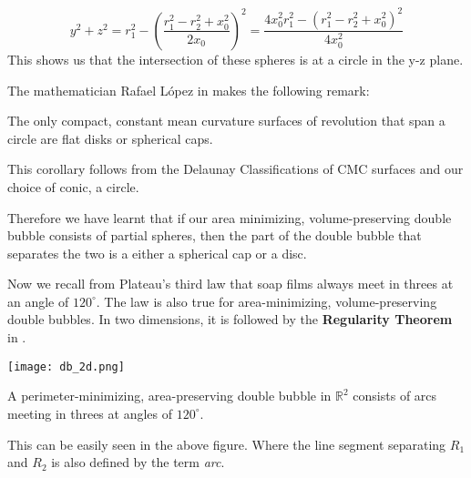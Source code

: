 \documentclass[a4paper,12pt]{report}
\begin{document}
\begin{equation}
y^{2}+z^{2}=r_{1}^{2} - (\frac{r_{1}^{2}-r_{2}^{2} + x_{0}^{2}}{2x_{0}})^{2} = \frac{4x_{0}^{2}r_{1}^{2} - (r_{1}^{2} - r_{2}^{2} + x_{0}^{2})^{2}}{4x_{0}^{2}}
\end{equation}
\vspace{1cm}
This shows us that the intersection of these spheres is at a circle in the y-z plane.\newline 
 
\hspace{-0.66cm}The mathematician Rafael L\'opez in \cite{lopez} makes the following remark:

\begin{corollary}
The only compact, constant mean curvature surfaces of revolution that span a circle are flat disks or spherical caps.
\end{corollary}

\hspace{-0.66cm}This corollary follows from the Delaunay Classifications of CMC surfaces and our choice of conic, a circle.

\hspace{-0.66cm}Therefore we have learnt that if our area minimizing, volume-preserving double bubble consists of partial spheres, then the part of the double bubble that separates the two is a either a spherical cap or a disc. 

Now we recall from Plateau's third law that soap films always meet in threes at an angle of $120^{\circ}$. The law is also true for area-minimizing, volume-preserving double bubbles. In two dimensions, it is followed by the \textbf{Regularity Theorem} in \cite{2d}.

\begin{center}
\texttt{[image: db\_2d.png]}
\end{center}

\begin{theorem}
A perimeter-minimizing, area-preserving double bubble in $\mathbb{R}^{2}$ consists of arcs meeting in threes at angles of $120^{\circ}$.
\end{theorem}

This can be easily seen in the above figure. Where the line segment separating $R_{1}$ and $R_{2}$ is also defined by the term  \textit{arc}.\newline 
\end{document}
